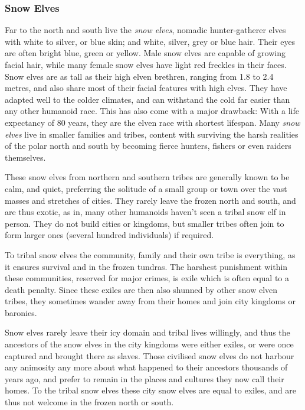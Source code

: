 \subsubsection{Snow Elves}
\label{sec:Snow Elves}


Far to the north and south live the \emph{snow elves}, nomadic hunter-gatherer
elves with white to silver, or blue skin; and white, silver, grey or blue
hair. Their eyes are often bright blue, green or yellow. Male snow elves are
capable of growing facial hair, while many female snow elves have light red
freckles in their faces. Snow elves are as tall as their high elven brethren,
ranging from 1.8 to 2.4 metres, and also share most of their facial features
with high elves. They have adapted well to the colder climates, and can
withstand the cold far easier than any other humanoid race. This has also come
with a major drawback: With a life expectancy of 80 years, they are the elven
race with shortest lifespan. Many \emph{snow elves} live in smaller families
and tribes, content with surviving the harsh realities of the polar north and
south by becoming fierce hunters, fishers or even raiders themselves.

These snow elves from northern and southern tribes are generally known to be
calm, and quiet, preferring the solitude of a small group or town over the
vast masses and stretches of cities. They rarely leave the frozen north and
south, and are thus exotic, as in, many other humanoids haven't seen a tribal
snow elf in person. They do not build cities or kingdoms, but smaller tribes
often join to form larger ones (several hundred individuals) if required.

To tribal snow elves the community, family and their own tribe is everything, as
it ensures survival and in the frozen tundras. The harshest punishment within
these communities, reserved for major crimes, is exile which is often equal to
a death penalty. Since these exiles are then also shunned by other snow elven
tribes, they sometimes wander away from their homes and join city kingdoms or
baronies.

Snow elves rarely leave their icy domain and tribal lives willingly, and thus
the ancestors of the snow elves in the city kingdoms were either exiles, or
were once captured and brought there as slaves. Those civilised snow elves do
not harbour any animosity any more about what happened to their ancestors
thousands of years ago, and prefer to remain in the places and cultures they
now call their homes. To the tribal snow elves these city snow elves are equal
to exiles, and are thus not welcome in the frozen north or south.

